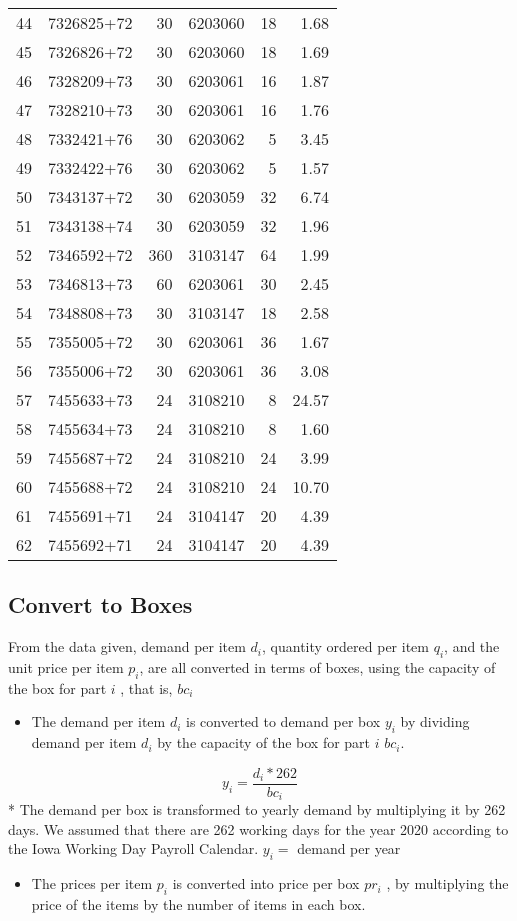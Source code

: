 \documentclass[
]{article}
\providecommand{\tightlist}{%
  \setlength{\itemsep}{0pt}\setlength{\parskip}{0pt}}
\begin{document}
\begin{longtable}[]{@{}rlrrrr@{}}
44 & 7326825+72 & 30 & 6203060 & 18 & 1.68\tabularnewline
45 & 7326826+72 & 30 & 6203060 & 18 & 1.69\tabularnewline
46 & 7328209+73 & 30 & 6203061 & 16 & 1.87\tabularnewline
47 & 7328210+73 & 30 & 6203061 & 16 & 1.76\tabularnewline
48 & 7332421+76 & 30 & 6203062 & 5 & 3.45\tabularnewline
49 & 7332422+76 & 30 & 6203062 & 5 & 1.57\tabularnewline
50 & 7343137+72 & 30 & 6203059 & 32 & 6.74\tabularnewline
51 & 7343138+74 & 30 & 6203059 & 32 & 1.96\tabularnewline
52 & 7346592+72 & 360 & 3103147 & 64 & 1.99\tabularnewline
53 & 7346813+73 & 60 & 6203061 & 30 & 2.45\tabularnewline
54 & 7348808+73 & 30 & 3103147 & 18 & 2.58\tabularnewline
55 & 7355005+72 & 30 & 6203061 & 36 & 1.67\tabularnewline
56 & 7355006+72 & 30 & 6203061 & 36 & 3.08\tabularnewline
57 & 7455633+73 & 24 & 3108210 & 8 & 24.57\tabularnewline
58 & 7455634+73 & 24 & 3108210 & 8 & 1.60\tabularnewline
59 & 7455687+72 & 24 & 3108210 & 24 & 3.99\tabularnewline
60 & 7455688+72 & 24 & 3108210 & 24 & 10.70\tabularnewline
61 & 7455691+71 & 24 & 3104147 & 20 & 4.39\tabularnewline
62 & 7455692+71 & 24 & 3104147 & 20 & 4.39\tabularnewline
\bottomrule
\end{longtable}

\hypertarget{convert-to-boxes}{%
\subsection{Convert to Boxes}\label{convert-to-boxes}}

From the data given, demand per item \(d_i\), quantity ordered per item
\(q_i\), and the unit price per item \(p_i\), are all converted in terms
of boxes, using the capacity of the box for part \(i\) , that is,
\(bc_i\)

\begin{itemize}
\tightlist
\item
  The demand per item \(d_i\) is converted to demand per box \(y_i\) by
  dividing demand per item \(d_i\) by the capacity of the box for part
  \(i\) \(bc_i\).
\end{itemize}

\[y_i=\frac {d_i*262}{bc_i} \] * The demand per box is transformed to
yearly demand by multiplying it by 262 days. We assumed that there are
262 working days for the year 2020 according to the Iowa Working Day
Payroll Calendar. \(y_i =\) demand per year

\begin{itemize}
\tightlist
\item
  The prices per item \(p_i\) is converted into price per box \(pr_i\) ,
  by multiplying the price of the items by the number of items in each
  box.
\end{itemize}
\end{document}
